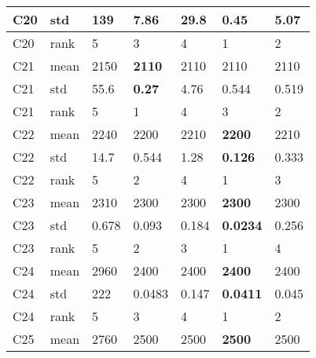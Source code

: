 \begin{table}[]
\begin{tabular}{|l|l|l|l|l|l|l|}
C20                  & std  & 139              & 7.86              & 29.8              & \textbf{0.45}     & 5.07              \\ \hline
C20                  & rank & 5                & 3                 & 4                 & 1                 & 2                 \\ \hline
C21                  & mean & 2150             & \textbf{2110}     & 2110              & 2110              & 2110              \\ \hline
C21                  & std  & 55.6             & \textbf{0.27}     & 4.76              & 0.544             & 0.519             \\ \hline
C21                  & rank & 5                & 1                 & 4                 & 3                 & 2                 \\ \hline
C22                  & mean & 2240             & 2200              & 2210              & \textbf{2200}     & 2210              \\ \hline
C22                  & std  & 14.7             & 0.544             & 1.28              & \textbf{0.126}    & 0.333             \\ \hline
C22                  & rank & 5                & 2                 & 4                 & 1                 & 3                 \\ \hline
C23                  & mean & 2310             & 2300              & 2300              & \textbf{2300}     & 2300              \\ \hline
C23                  & std  & 0.678            & 0.093             & 0.184             & \textbf{0.0234}   & 0.256             \\ \hline
C23                  & rank & 5                & 2                 & 3                 & 1                 & 4                 \\ \hline
C24                  & mean & 2960             & 2400              & 2400              & \textbf{2400}     & 2400              \\ \hline
C24                  & std  & 222              & 0.0483            & 0.147             & \textbf{0.0411}   & 0.045             \\ \hline
C24                  & rank & 5                & 3                 & 4                 & 1                 & 2                 \\ \hline
C25                  & mean & 2760             & 2500              & 2500              & \textbf{2500}     & 2500              \\ \hline

\end{tabular}
\end{table}
